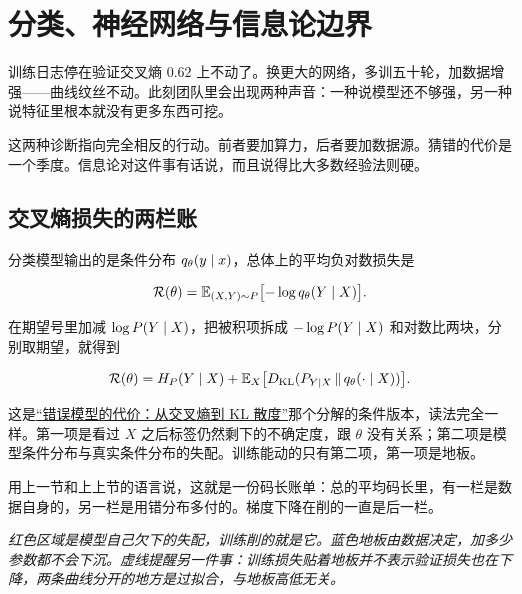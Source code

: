 \section{分类、神经网络与信息论边界}
\label{sec:07-Information-Theory/06-Information-and-Learning/04}

训练日志停在验证交叉熵 \(0.62\) 上不动了。换更大的网络，多训五十轮，加数据增强——曲线纹丝不动。此刻团队里会出现两种声音：一种说模型还不够强，另一种说特征里根本就没有更多东西可挖。

这两种诊断指向完全相反的行动。前者要加算力，后者要加数据源。猜错的代价是一个季度。信息论对这件事有话说，而且说得比大多数经验法则硬。

\subsection{交叉熵损失的两栏账}

分类模型输出的是条件分布 \(q_\theta(y\mid x)\)，总体上的平均负对数损失是

\[
\mathcal R(\theta)=\mathbb{E}_{(X,Y)\sim P}\bigl[-\log q_\theta(Y\mid X)\bigr].
\]

在期望号里加减 \(\log P(Y\mid X)\)，把被积项拆成 \(-\log P(Y\mid X)\) 和对数比两块，分别取期望，就得到

\[
\mathcal R(\theta)=H_P(Y\mid X)+\mathbb{E}_X\bigl[D_{\mathrm{KL}}(P_{Y\mid X}\,\|\,q_\theta(\cdot\mid X))\bigr].
\]

这是\hyperref[sec:07-Information-Theory/03-Divergences/01]{``错误模型的代价：从交叉熵到 KL 散度''}那个分解的条件版本，读法完全一样。第一项是看过 \(X\) 之后标签仍然剩下的不确定度，跟 \(\theta\) 没有关系；第二项是模型条件分布与真实条件分布的失配。训练能动的只有第二项，第一项是地板。

用上一节和上上节的语言说，这就是一份码长账单：总的平均码长里，有一栏是数据自身的，另一栏是用错分布多付的。梯度下降在削的一直是后一栏。

\begin{center}

\emph{红色区域是模型自己欠下的失配，训练削的就是它。蓝色地板由数据决定，加多少参数都不会下沉。虚线提醒另一件事：训练损失贴着地板并不表示验证损失也在下降，两条曲线分开的地方是过拟合，与地板高低无关。}
\end{center}

